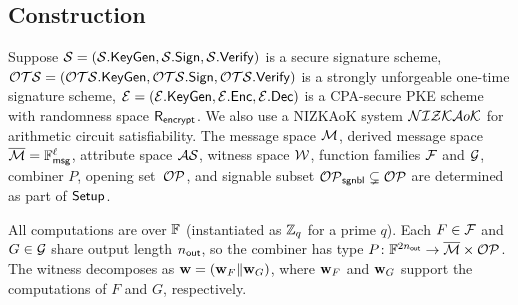 \subsection{Construction}\label{subsection:generic-SMS-description}
Suppose $\mathcal{S} = (\mathcal{S}.\mathsf{KeyGen}, \mathcal{S}.\mathsf{Sign}, \mathcal{S}.\mathsf{Verify})$ is
a secure signature scheme,
$\mathcal{OTS} = (\mathcal{OTS}.\mathsf{KeyGen}, \mathcal{OTS}.\mathsf{Sign}, \mathcal{OTS}.\mathsf{Verify})$ is
a strongly unforgeable one-time signature scheme,
$\mathcal{E} = (\mathcal{E}.\mathsf{KeyGen}, \mathcal{E}.\mathsf{Enc}, \mathcal{E}.\mathsf{Dec})$ is 
a CPA-secure PKE scheme with randomness space $\mathsf{R}_\mathsf{encrypt}$.
We also use a NIZKAoK system $\mathcal{NIZKA}o\mathcal{K}$
for arithmetic circuit satisfiability.
The message space $\mathcal{M}$, derived message space $\overline{\mathcal{M}} = \mathbb{F}^\ell_\mathsf{msg}$,
attribute space $\mathcal{AS}$, witness space $\mathcal{W}$,
function families $\mathcal{F}$ and $\mathcal{G}$, combiner $P$,
opening set~$\mathcal{OP}$, and signable subset $\mathcal{OP}_\mathsf{sgnbl} \subsetneq \mathcal{OP}$
are determined as part of $\mathsf{Setup}$.

All computations are over $\mathbb{F}$ (instantiated as $\mathbb{Z}_q$ for a prime $q$).
Each $F \in \mathcal{F}$ and $G \in \mathcal{G}$ share output length $n_\mathsf{out}$,
so the combiner has type $P \colon \mathbb{F}^{2n_\mathsf{out}} \to \overline{\mathcal{M}} \times \mathcal{OP}$.
The witness decomposes as $\mathbf{w} = (\mathbf{w}_F \| \mathbf{w}_G)$,
where $\mathbf{w}_F$ and $\mathbf{w}_G$ support the computations of $F$ and $G$, respectively.

